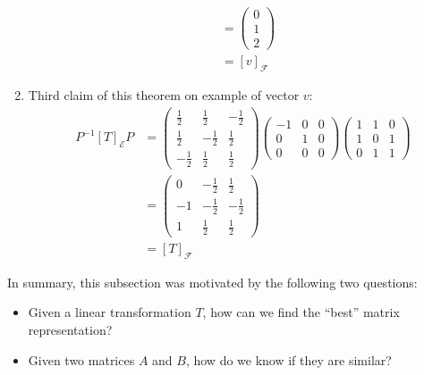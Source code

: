 \begin{exm}
\begin{enumerate}
\begin{align*}
			                            & =\begin{pmatrix}
				      0 \\1\\2
			      \end{pmatrix}                           \\
			                            & =[v]_\mathcal{F}
		      \end{align*}
		\item Third claim of this theorem on example of vector $v$:
		      \begin{align*}
			      P^{-1}[T]_\mathcal{E}P & =\begin{pmatrix}
				      \frac{1}{2}  & \frac{1}{2}  & -\frac{1}{2} \\[4pt]
				      \frac{1}{2}  & -\frac{1}{2} & \frac{1}{2}  \\[4pt]
				      -\frac{1}{2} & \frac{1}{2}  & \frac{1}{2}
			      \end{pmatrix}\begin{pmatrix}
				      -1 & 0 & 0 \\
				      0  & 1 & 0 \\
				      0  & 0 & 0
			      \end{pmatrix}\begin{pmatrix}
				      1 & 1 & 0 \\
				      1 & 0 & 1 \\
				      0 & 1 & 1
			      \end{pmatrix} \\
			                             & =\begin{pmatrix}
				      0  & -\frac{1}{2} & \frac{1}{2}  \\[4pt]
				      -1 & -\frac{1}{2} & -\frac{1}{2} \\[4pt]
				      1  & \frac{1}{2}  & \frac{1}{2}
			      \end{pmatrix}                                                     \\
			                             & =[T]_\mathcal{F}
		      \end{align*}
	\end{enumerate}
\end{exm}

\begin{rem}
	In summary, this subsection was motivated by the following two questions:
	\begin{itemize}
		\item Given a linear transformation $T$, how can we find the \enquote{best} matrix
		      representation?
		\item Given two matrices $A$ and $B$, how do we know if they are similar?
	\end{itemize}
\end{rem}

